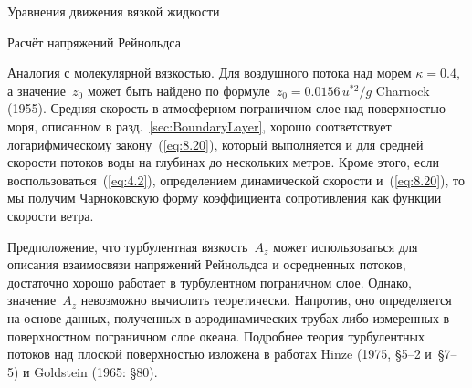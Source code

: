 \begin{chapter}{Уравнения движения вязкой жидкости}
\begin{section}{Расчёт напряжений Рейнольдса}
\begin{paragraph}{Аналогия с молекулярной вязкостью.}
Для воздушного потока над морем $\kappa = 0.4$, а значение~$z_0$ может быть
найдено по формуле~$z_0 = 0.0156 \, u^{*2}/g$ Charnock (1955). 
Средняя скорость в атмосферном пограничном слое над поверхностью моря, 
описанном в разд.~\ref{sec:BoundaryLayer}, хорошо соответствует 
логарифмическому закону~(\ref{eq:8.20}), который выполняется и для средней
скорости потоков воды на глубинах до нескольких метров. Кроме этого,
если воспользоваться~(\ref{eq:4.2}), определением динамической скорости%
 и~(\ref{eq:8.20}), 
то мы получим Чарноковскую форму коэффициента
сопротивления как функции скорости ветра.
%

Предположение, что турбулентная вязкость~$A_z$ может использоваться для 
описания взаимосвязи напряжений Рейнольдса и осредненных потоков, достаточно
хорошо работает в турбулентном пограничном слое. Однако, значение~$A_z$ 
невозможно вычислить теоретически. Напротив, оно определяется на основе 
данных, полученных в аэродинамических трубах либо измеренных в поверхностном
пограничном слое океана. Подробнее теория турбулентных потоков над плоской
поверхностью изложена в 
работах Hinze (1975, \S5--2 и~\S7--5) и Goldstein (1965: \S80).
%


\end{paragraph}
\end{section}
\end{chapter}
